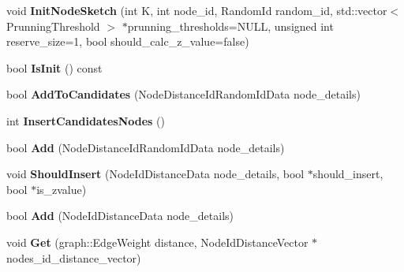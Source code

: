 \begin{DoxyCompactItemize}
\item 
\hypertarget{classall__distance__sketch_1_1NodeSketch_ae6f17ef2bbcc0ec070be6ad4c668e214}{}void {\bfseries Init\+Node\+Sketch} (int K, int node\+\_\+id, Random\+Id random\+\_\+id, std\+::vector$<$ Prunning\+Threshold $>$ $\ast$prunning\+\_\+thresholds=N\+U\+L\+L, unsigned int reserve\+\_\+size=1, bool should\+\_\+calc\+\_\+z\+\_\+value=false)\label{classall__distance__sketch_1_1NodeSketch_ae6f17ef2bbcc0ec070be6ad4c668e214}

\item 
\hypertarget{classall__distance__sketch_1_1NodeSketch_a125a3c3d42b4ee2a81087861568f7af4}{}bool {\bfseries Is\+Init} () const \label{classall__distance__sketch_1_1NodeSketch_a125a3c3d42b4ee2a81087861568f7af4}

\item 
\hypertarget{classall__distance__sketch_1_1NodeSketch_a3a5af0bc95c5d6dc2a309c390ab88323}{}bool {\bfseries Add\+To\+Candidates} (Node\+Distance\+Id\+Random\+Id\+Data node\+\_\+details)\label{classall__distance__sketch_1_1NodeSketch_a3a5af0bc95c5d6dc2a309c390ab88323}

\item 
\hypertarget{classall__distance__sketch_1_1NodeSketch_a81fccf7bada85317e4da936e56e804ce}{}int {\bfseries Insert\+Candidates\+Nodes} ()\label{classall__distance__sketch_1_1NodeSketch_a81fccf7bada85317e4da936e56e804ce}

\item 
\hypertarget{classall__distance__sketch_1_1NodeSketch_a769e9f5b63b1b0d735b4caff2812f430}{}bool {\bfseries Add} (Node\+Distance\+Id\+Random\+Id\+Data node\+\_\+details)\label{classall__distance__sketch_1_1NodeSketch_a769e9f5b63b1b0d735b4caff2812f430}

\item 
\hypertarget{classall__distance__sketch_1_1NodeSketch_a255ee09f6a495ff7f016e955bc67b5db}{}void {\bfseries Should\+Insert} (Node\+Id\+Distance\+Data node\+\_\+details, bool $\ast$should\+\_\+insert, bool $\ast$is\+\_\+zvalue)\label{classall__distance__sketch_1_1NodeSketch_a255ee09f6a495ff7f016e955bc67b5db}

\item 
\hypertarget{classall__distance__sketch_1_1NodeSketch_add89c73110e18a1bc4295ec666bc33cb}{}bool {\bfseries Add} (Node\+Id\+Distance\+Data node\+\_\+details)\label{classall__distance__sketch_1_1NodeSketch_add89c73110e18a1bc4295ec666bc33cb}

\item 
\hypertarget{classall__distance__sketch_1_1NodeSketch_adaf41826d457225b832c8aace7af0167}{}void {\bfseries Get} (graph\+::\+Edge\+Weight distance, Node\+Id\+Distance\+Vector $\ast$nodes\+\_\+id\+\_\+distance\+\_\+vector)\label{classall__distance__sketch_1_1NodeSketch_adaf41826d457225b832c8aace7af0167}


\end{DoxyCompactItemize}
